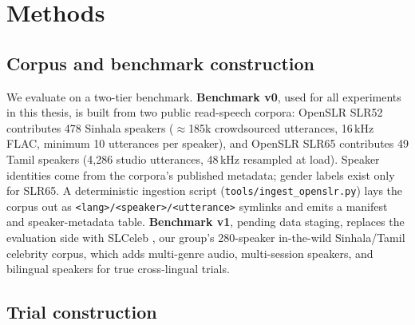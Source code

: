 
\chapter{Methods}
\label{ch:methods}

\section{Corpus and benchmark construction}
\label{ssec:corpus}

We evaluate on a two-tier benchmark. \textbf{Benchmark v0}, used for
all experiments in this thesis, is built from two public read-speech
corpora: OpenSLR SLR52 \cite{kjartansson2018slr52} contributes 478
Sinhala speakers ($\approx$185k crowdsourced utterances, 16\,kHz FLAC,
minimum 10 utterances per speaker), and OpenSLR SLR65
\cite{he2020opensource} contributes 49 Tamil speakers (4{,}286 studio
utterances, 48\,kHz resampled at load). Speaker identities come from
the corpora's published metadata; gender labels exist only for SLR65.
A deterministic ingestion script (\texttt{tools/ingest\_openslr.py})
lays the corpus out as
\texttt{<lang>/<speaker>/<utterance>} symlinks and emits a manifest
and speaker-metadata table. \textbf{Benchmark v1}, pending data
staging, replaces the evaluation side with SLCeleb
\cite{slceleb2025}, our group's 280-speaker in-the-wild
Sinhala/Tamil celebrity corpus, which adds multi-genre audio,
multi-session speakers, and bilingual speakers for true
cross-lingual trials.

\section{Trial construction}
\label{ssec:trials}

